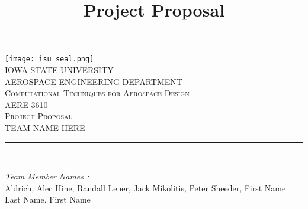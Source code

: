 \documentclass[12pt]{article}
\begin{document}
\title{Project Proposal}

\begin{titlepage}
	\centering
    \vspace*{0.5 cm}
    \texttt{[image: isu\_seal.png]}\\[1.0 cm]	%
    \textsc{\LARGE IOWA STATE UNIVERSITY}\\[2.0 cm]
    \textsc{\large AEROSPACE ENGINEERING DEPARTMENT}\\[0.2 cm]
    \textsc{\large Computational Techniques for Aerospace Design}\\[0.2 cm]
	\textsc{\Large AERE 3610}\\[0.5 cm]				%
	\textsc{\Large Project Proposal}\\[0.2 cm]
	\textsc{\Large TEAM NAME HERE}\\[0.2 cm]
	\rule{\linewidth}{0.2 mm} \\[0.4 cm]
	
	
	\begin{minipage}{0.8\textwidth}
		
			\begin{flushleft} 
			\emph{Team Member Names :} \\
			Aldrich, Alec\linebreak
			Hine, Randall\linebreak
			Leuer, Jack\linebreak
			Mikolitis, Peter\linebreak
			Sheeder, First Name\linebreak
			Last Name, First Name\linebreak
			
		\end{flushleft}
	\end{minipage}\\[2 cm]
	
	\vfill
	
\end{titlepage}

\tableofcontents
\pagebreak
\end{document}
